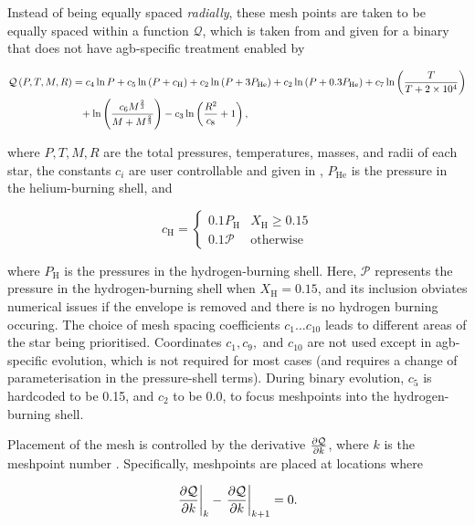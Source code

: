 Instead of being equally spaced \textit{radially}, these mesh points are taken to be equally spaced within a function $\mathcal{Q}$, which is taken from \citet{Stancliffe:2004} and given for a binary that does not have \gls{agb}-specific treatment enabled by

\begin{align}
    \mathcal{Q}\left(P, T, M, R\right) &= c_4\ln P + c_5\ln\left(P+c_\text{H}\right) + c_2\ln\left(P+3 P_\text{He}\right) + c_2\ln\left(P+0.3 P_\text{He}\right) + c_7\ln\left(\frac{T}{T+2\times 10^4}\right) \notag\\
    &\phantom{=} + \ln\left(\frac{c_6M^\frac23}{M + M^\frac23}\right) - c_3\ln\left(\frac{R^2}{c_8}+1\right),
\end{align}

where $P, T, M, R$ are the total pressures, temperatures, masses, and radii of each star, the constants $c_i$ are user controllable and given in , $P_\text{He}$ is the pressure in the helium-burning shell, and

\begin{equation}
    c_\text{H} = \begin{cases}
        0.1 P_\text{H} & X_\text{H} \geq 0.15 \\
        0.1 \mathcal{P} & \text{otherwise}
    \end{cases}
\end{equation}

where $P_\text{H}$ is the pressures in the hydrogen-burning shell. Here, $\mathcal{P}$ represents the pressure in the hydrogen-burning shell when $X_\text{H} = 0.15$, and its inclusion obviates numerical issues if the envelope is removed and there is no hydrogen burning occuring. The choice of mesh spacing coefficients $c_1\dots c_{10}$ leads to different areas of the star being prioritised. Coordinates $c_1, c_9,$ and $c_{10}$ are not used except in \gls{agb}-specific evolution, which is not required for most cases (and requires a change of parameterisation in the pressure-shell terms). During binary evolution, $c_5$ is hardcoded to be 0.15, and $c_2$ to be 0.0, to focus meshpoints into the hydrogen-burning shell.

Placement of the mesh is controlled by the derivative $\pdv{\mathcal{Q}}{k}$, where $k$ is the meshpoint number \citep{Stancliffe:2016}. Specifically, meshpoints are placed at locations where

\begin{equation}
    \eval{\pdv{\mathcal{Q}}{k}}{k}-\eval{\pdv{\mathcal{Q}}{k}}{k+1} = 0.
\end{equation}

